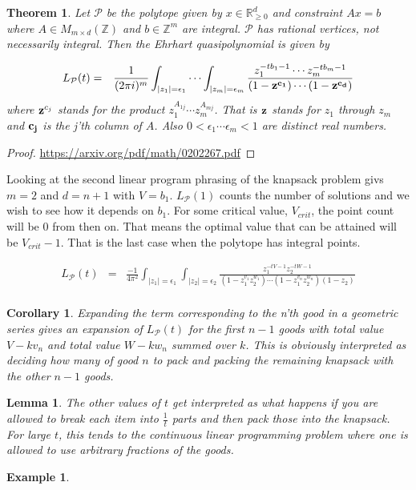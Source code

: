 \documentclass[11pt]{article}
\newcommand\abs[1]{ \mid #1 \mid }
\theoremstyle{change}
\newtheorem{theorem}[equation]{Theorem}
\newtheorem{lemma}[equation]{Lemma}
\newtheorem{cor}[equation]{Corollary}
\newtheorem{example}[equation]{Example}
\theoremstyle{nonumberplain}
\newtheorem{proof}{Proof}
\numberwithin{equation}{section}
\begin{document}
\begin{theorem}
Let $\mathcal{P}$ be the polytope given by $x \in \mathbb{R}_{\geq 0}^d$ and constraint $Ax = b$ where $A \in M_{m \times d}(\mathbb{Z})$ and $b \in \mathbb{Z}^m$ are integral. $\mathcal{P}$ has rational vertices, not necessarily integral. Then the Ehrhart quasipolynomial is given by

\begin{eqnarray*}
L_\mathcal{P} (t) &=& \frac{1}{(2\pi i)^m} \int_{\abs{z_1}=\epsilon_1} \cdots  \int_{\abs{z_m}=\epsilon_m} \frac{z_1^{-t b_1 -1} \cdots z_m^{-t b_m -1}}{(1-\bold{z}^{\bold{c_1}}) \cdots (1-\bold{z}^{\bold{c_d}})}\\
\end{eqnarray*}
where $\bold{z}^{c_j}$ stands for the product $z_1^{A_{1j}} \cdots z_m^{A_{mj}}$. That is $\bold{z}$ stands for $z_1$ through $z_m$ and $\bold{c_j}$ is the j'th column of $A$. Also $0 < \epsilon_1 \cdots \epsilon_m <1$ are distinct real numbers.

\end{theorem}

\begin{proof}
\url{https://arxiv.org/pdf/math/0202267.pdf}
\end{proof}

Looking at the second linear program phrasing of the knapsack problem givs $m=2$ and $d=n+1$ with $V=b_1$. $L_\mathcal{P} (1)$ counts the number of solutions and we wish to see how it depends on $b_1$. For some critical value, $V_{crit}$, the point count will be $0$ from then on. That means the optimal value that can be attained will be $V_{crit}-1$. That is the last case when the polytope has integral points.

\begin{eqnarray*}
L_\mathcal{P} (t) &=& \frac{-1}{4 \pi^2} \int_{\abs{z_1}=\epsilon_1} \int_{\abs{z_2}=\epsilon_2} \frac{z_1^{-t V -1} z_2^{-t W -1}}{(1-z_1^{v_1} z_2^{w_1}) \cdots (1-z_1^{v_n} z_2^{w_n}) (1-z_2)}\\
\end{eqnarray*}

\begin{cor}
Expanding the term corresponding to the n'th good in a geometric series gives an expansion of $L_\mathcal{P} (t)$ for the first $n-1$ goods with total value $V-kv_n$ and total value $W-kw_n$ summed over $k$. This is obviously interpreted as deciding how many of good $n$ to pack and packing the remaining knapsack with the other $n-1$ goods.
\end{cor}

\begin{lemma}
The other values of $t$ get interpreted as what happens if you are allowed to break each item into $\frac{1}{t}$ parts and then pack those into the knapsack. For large $t$, this tends to the continuous linear programming problem where one is allowed to use arbitrary fractions of the goods.
\end{lemma}

\begin{example}

\end{example}
\end{document}
